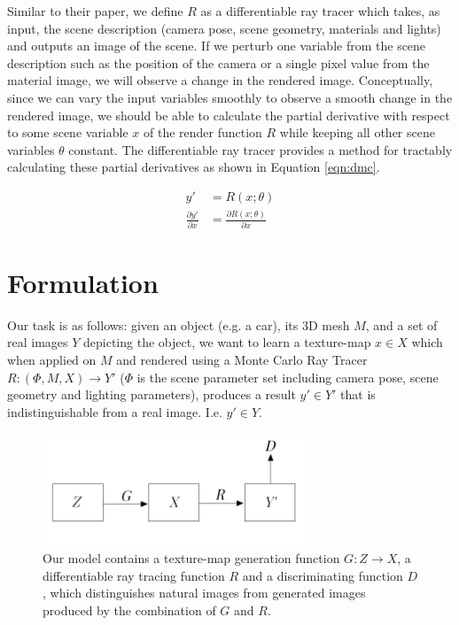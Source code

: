 \documentclass[letterpaper,doc,natbib]{apa6}
\begin{document}
Similar to their paper, we define $R$ as a differentiable ray tracer which takes, as input, the scene description (camera pose, scene geometry, materials and lights) and outputs an image of the scene. If we perturb one variable from the scene description such as the position of the camera or a single pixel value from the material image, we will observe a change in the rendered image. Conceptually, since we can vary the input variables smoothly to observe a smooth change in the rendered image, we should be able to calculate the partial derivative with respect to some scene variable $x$ of the render function $R$ while keeping all other scene variables $\theta$ constant. The differentiable ray tracer provides a method for tractably calculating these partial derivatives as shown in Equation \ref{eqn:dmc}.

\begin{equation} \label{eqn:dmc}
\begin{split}
    y' & = R(x; \theta)\\
    \frac{\partial y'}{\partial x} & = \frac{\partial R(x; \theta)}{\partial x}
\end{split}
\end{equation}

\section{Formulation}
Our task is as follows: given an object (e.g. a car), its 3D mesh $M$, and a set of real images $Y$ depicting the object, we want to learn a texture-map $x \in X$ which when applied on $M$ and rendered using a Monte Carlo Ray Tracer $R : (\Phi, M, X)  \rightarrow Y'$ ($\Phi$ is the scene parameter set including camera pose, scene geometry and lighting parameters), produces a result $y' \in Y'$ that is indistinguishable from a real image. I.e. $y' \in Y$.

\begin{figure}
\centering
\includegraphics[width=0.7\textwidth]{formulation.png}
\caption{\label{fig:formulation} Our model contains a texture-map generation function $G : Z \rightarrow X$, a differentiable ray tracing function $R$ and a discriminating function $D$, which distinguishes natural images from generated images produced by the combination of $G$ and $R$.}
\end{figure}
\end{document}
